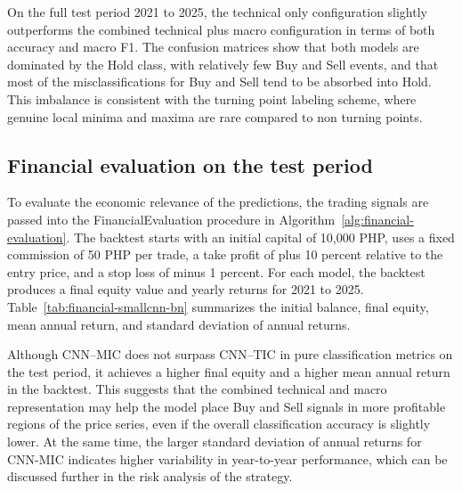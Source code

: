 \documentclass[12pt,a4paper]{article}
\begin{document}
 On the full test period 2021 to 2025, the technical only configuration slightly outperforms the combined technical plus macro configuration in terms of both accuracy and macro F1. The confusion matrices show that both models are dominated by the Hold class, with relatively few Buy and Sell events, and that most of the misclassifications for Buy and Sell tend to be absorbed into Hold. This imbalance is consistent with the turning point labeling scheme, where genuine local minima and maxima are rare compared to non turning points.

\subsection{Financial evaluation on the test period}

To evaluate the economic relevance of the predictions, the trading signals are passed into the FinancialEvaluation procedure in Algorithm~\ref{alg:financial-evaluation}. The backtest starts with an initial capital of 10{,}000 PHP, uses a fixed commission of 50 PHP per trade, a take profit of plus 10 percent relative to the entry price, and a stop loss of minus 1 percent. For each model, the backtest produces a final equity value and yearly returns for 2021 to 2025. Table~\ref{tab:financial-smallcnn-bn} summarizes the initial balance, final equity, mean annual return, and standard deviation of annual returns.

\begin{table}[H]
	\centering
	\caption{Financial evaluation on 2021 to 2025 using FinancialEvaluation, initial capital 10{,}000 PHP, commission 50 PHP, take profit 10 percent, stop loss 1 percent.}
	\label{tab:financial-smallcnn-bn}
	\small
	\setlength{\tabcolsep}{2pt} %
	\renewcommand{\arraystretch}{2}
\end{table}

Although CNN--MIC does not surpass CNN--TIC in pure classification metrics on the test period, it achieves a higher final equity and a higher mean annual return in the backtest. This suggests that the combined technical and macro representation may help the model place Buy and Sell signals in more profitable regions of the price series, even if the overall classification accuracy is slightly lower. At the same time, the larger standard deviation of annual returns for CNN-MIC indicates higher variability in year-to-year performance, which can be discussed further in the risk analysis of the strategy.
\end{document}
